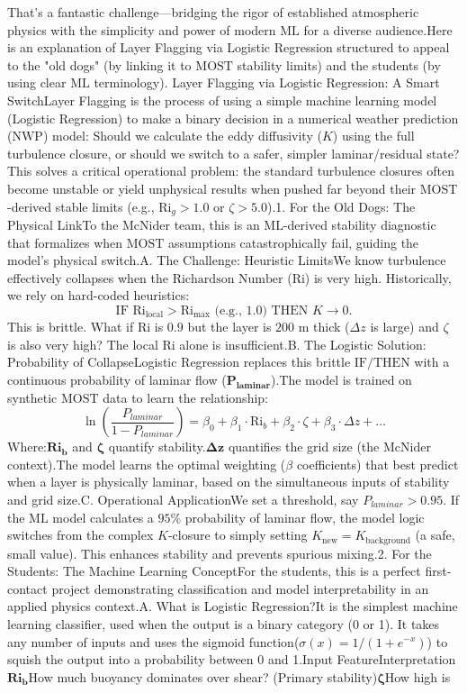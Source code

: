 That's a fantastic challenge—bridging the rigor of established atmospheric physics with the simplicity and power of modern $\text{ML}$ for a diverse audience.Here is an explanation of Layer Flagging via Logistic Regression structured to appeal to the "old dogs" (by linking it to $\text{MOST}$ stability limits) and the students (by using clear $\text{ML}$ terminology). Layer Flagging via Logistic Regression: A Smart SwitchLayer Flagging is the process of using a simple machine learning model (Logistic Regression) to make a binary decision in a numerical weather prediction ($\text{NWP}$) model: Should we calculate the eddy diffusivity ($K$) using the full turbulence closure, or should we switch to a safer, simpler laminar/residual state?This solves a critical operational problem: the standard turbulence closures often become unstable or yield unphysical results when pushed far beyond their $\text{MOST}$-derived stable limits (e.g., $\text{Ri}_g > 1.0$ or $\zeta > 5.0$).1. For the Old Dogs: The Physical LinkTo the $\text{McNider}$ team, this is an ML-derived stability diagnostic that formalizes when $\text{MOST}$ assumptions catastrophically fail, guiding the model's physical switch.A. The Challenge: Heuristic LimitsWe know turbulence effectively collapses when the $\text{Richardson Number}$ ($\text{Ri}$) is very high. Historically, we rely on hard-coded heuristics:$$\text{IF } \text{Ri}_{\text{local}} > \text{Ri}_{\max} \text{ (e.g., } 1.0) \text{ THEN } K \to 0.$$This is brittle. What if $\text{Ri}$ is $0.9$ but the layer is $200 \text{ m}$ thick ($\Delta z$ is large) and $\zeta$ is also very high? The local $\text{Ri}$ alone is insufficient.B. The Logistic Solution: Probability of CollapseLogistic Regression replaces this brittle $\text{IF/THEN}$ with a continuous probability of laminar flow ($\mathbf{P_{laminar}}$).The model is trained on synthetic $\text{MOST}$ data to learn the relationship:$$\ln\left(\frac{P_{laminar}}{1 - P_{laminar}}\right) = \beta_0 + \beta_1 \cdot \text{Ri}_b + \beta_2 \cdot \zeta + \beta_3 \cdot \Delta z + \dots$$Where:$\mathbf{\text{Ri}_b}$ and $\mathbf{\zeta}$ quantify stability.$\mathbf{\Delta z}$ quantifies the grid size (the $\text{McNider}$ context).The model learns the optimal weighting ($\beta$ coefficients) that best predict when a layer is physically laminar, based on the simultaneous inputs of stability and grid size.C. Operational ApplicationWe set a threshold, say $P_{laminar} > 0.95$. If the $\text{ML}$ model calculates a $95\%$ probability of laminar flow, the model logic switches from the complex $K$-closure to simply setting $K_{\text{new}} = K_{\text{background}}$ (a safe, small value). This enhances stability and prevents spurious mixing.2. For the Students: The Machine Learning ConceptFor the students, this is a perfect first-contact project demonstrating classification and model interpretability in an applied physics context.A. What is Logistic Regression?It is the simplest machine learning classifier, used when the output is a binary category (0 or 1). It takes any number of inputs and uses the sigmoid function($\sigma(x) = 1/(1+e^{-x})$) to squish the output into a probability between 0 and 1.Input FeatureInterpretation$\mathbf{\text{Ri}_b}$How much buoyancy dominates over shear? (Primary stability)$\mathbf{\zeta}$How high is 